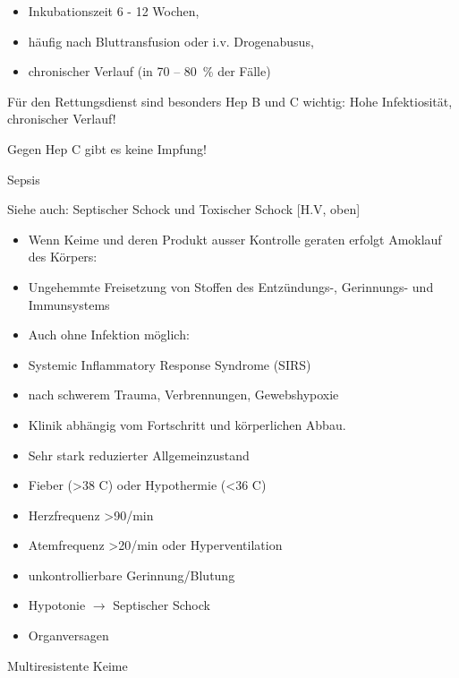 \documentclass{article}
\begin{document}
\begin{itemize}
\item Inkubationszeit 6 - 12 Wochen, 

\item h\"aufig nach Bluttransfusion oder i.v. Drogenabusus, 

\item chronischer Verlauf (in 70 -- 80~\% der F\"alle)

\end{itemize}
F\"ur den Rettungsdienst sind besonders Hep B und C wichtig: Hohe
Infektiosit\"at, chronischer Verlauf!

Gegen Hep C gibt es keine Impfung!

\label{bkm:RefHeading41252510}Sepsis

Siehe auch: Septischer Schock und Toxischer Schock
[H.V{\guillemotright}\pageref{bkm:RefHeading41284910}, oben]

\begin{itemize}
\item Wenn Keime und deren Produkt ausser Kontrolle geraten erfolgt
Amoklauf des K\"orpers:

\item Ungehemmte Freisetzung von Stoffen des Entz\"undungs-, Gerinnungs-
und Immunsystems

\item Auch ohne Infektion m\"oglich:

\end{itemize}
\begin{itemize}
\item Systemic Inflammatory Response Syndrome (SIRS) 

\end{itemize}
\begin{itemize}
\item nach schwerem Trauma, Verbrennungen, Gewebshypoxie

\item Klinik abh\"angig vom Fortschritt und k\"orperlichen Abbau.

\end{itemize}
\begin{itemize}
\item Sehr stark reduzierter Allgemeinzustand

\item Fieber ({\textgreater}38{\textdegree} C) oder Hypothermie
({\textless}36{\textdegree} C)

\item Herzfrequenz {\textgreater}90/min

\item Atemfrequenz {\textgreater}20/min oder Hyperventilation

\item unkontrollierbare Gerinnung/Blutung

\item Hypotonie ${\rightarrow}$ Septischer Schock

\item Organversagen  

\end{itemize}
Multiresistente Keime
\end{document}
